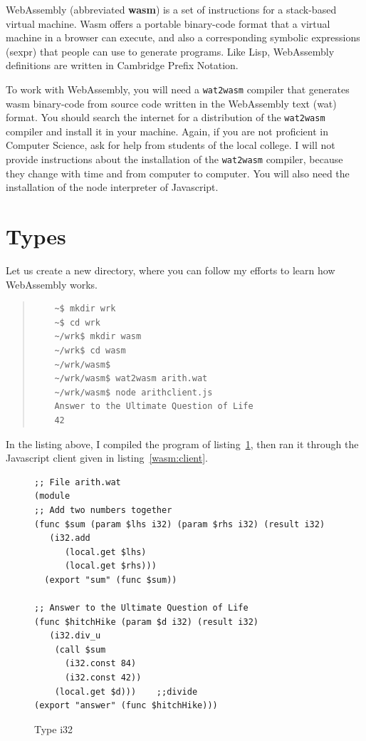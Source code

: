 \documentclass[a4paper,12pt]{book}
\begin{document}
WebAssembly (abbreviated {\bf wasm}) is a set of instructions
for a stack-based virtual machine. Wasm offers a portable
binary-code format that a virtual machine in a browser
can execute, and also a corresponding symbolic
expressions (sexpr) that people can use to generate
programs. Like Lisp, WebAssembly definitions are written
in Cambridge Prefix Notation.

To work with WebAssembly, you will need a \verb|wat2wasm|
compiler that generates wasm binary-code from source
code written in the WebAssembly text (wat) format.
You should search the internet for a distribution of
the \verb|wat2wasm| compiler and install it in your
machine. Again, if you are not proficient in Computer
Science, ask for help from students of the local college.
I will not provide instructions about the installation
of the \verb|wat2wasm| compiler, because they change
with time and from computer to computer. You will also
need the installation of the node interpreter of
Javascript.


\section{Types}

Let us create a new directory, where you can follow my
efforts to learn how WebAssembly works.

\begin{quote}
  \begin{verbatim}
    ~$ mkdir wrk
    ~$ cd wrk
    ~/wrk$ mkdir wasm
    ~/wrk$ cd wasm
    ~/wrk/wasm$
    ~/wrk/wasm$ wat2wasm arith.wat
    ~/wrk/wasm$ node arithclient.js
    Answer to the Ultimate Question of Life
    42
  \end{verbatim}
\end{quote}
In the listing above, I compiled the program of
listing~\ref{wasm:i32}, then ran it through the
Javascript client given in listing~\ref{wasm:client}.


\begin{figure}[!h]
\begin{verbatim}
;; File arith.wat
(module
;; Add two numbers together
(func $sum (param $lhs i32) (param $rhs i32) (result i32)
   (i32.add
      (local.get $lhs)
      (local.get $rhs)))
  (export "sum" (func $sum))

;; Answer to the Ultimate Question of Life
(func $hitchHike (param $d i32) (result i32)
   (i32.div_u
    (call $sum
      (i32.const 84)
      (i32.const 42))  
    (local.get $d)))    ;;divide
(export "answer" (func $hitchHike)))
\end{verbatim}

\caption{Type i32}
\label{wasm:i32}
\end{figure}
\end{document}
